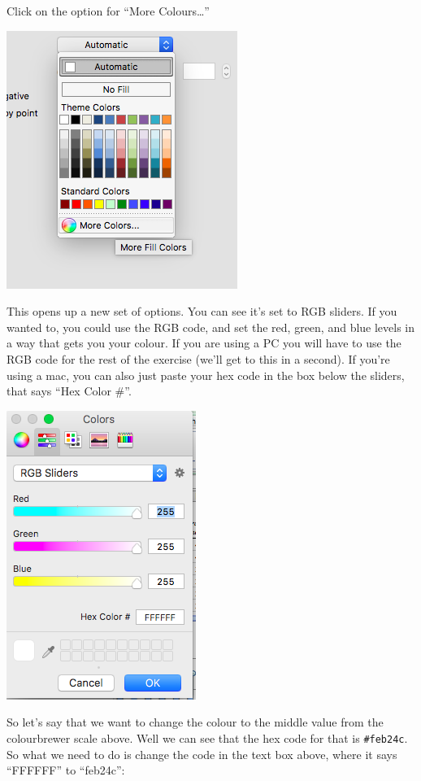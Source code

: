 \documentclass[
]{book}
\begin{document}
Click on the option for ``More Colours\ldots{}''

\includegraphics{imgs/manual_fill_2.png}

This opens up a new set of options. You can see it's set to RGB sliders. If you wanted to, you could use the RGB code, and set the red, green, and blue levels in a way that gets you your colour. If you are using a PC you will have to use the RGB code for the rest of the exercise (we'll get to this in a second). If you're using a mac, you can also just paste your hex code in the box below the sliders, that says ``Hex Color \#''.

\includegraphics{imgs/manual_fill_4.png}

So let's say that we want to change the colour to the middle value from the colourbrewer scale above. Well we can see that the hex code for that is \texttt{\#feb24c}. So what we need to do is change the code in the text box above, where it says ``FFFFFF'' to ``feb24c'':
\end{document}

